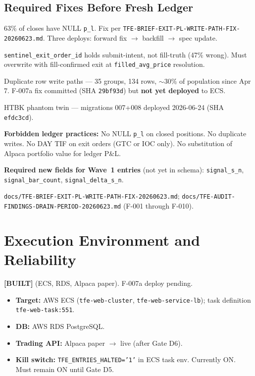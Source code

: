 \documentclass[11pt,a4paper]{article}
\newcommand{\statusbuilt}{\textcolor{statusbuilt}{\textbf{[BUILT]}}}
\newcommand{\code}[1]{\texttt{\small#1}}
\newcommand{\sha}[1]{\texttt{\footnotesize#1}}
\begin{document}
\subsection{Required Fixes Before Fresh Ledger}

\begin{description}[leftmargin=2.5cm, style=nextline]
  \item[\textbf{F-001 (BLOCKS)}] 63\% of closes have NULL \code{p\_l}. Fix per \texttt{TFE-BRIEF-EXIT-PL-WRITE-PATH-FIX-20260623.md}. Three deploys: forward fix $\to$ backfill $\to$ spec update.
  \item[\textbf{F-002 (BLOCKS)}] \code{sentinel\_exit\_order\_id} holds submit-intent, not fill-truth (47\% wrong). Must overwrite with fill-confirmed exit at \code{filled\_avg\_price} resolution.
  \item[\textbf{F-003 (BLOCKS)}] Duplicate row write paths — 35 groups, 134 rows, $\sim$30\% of population since Apr 7. F-007a fix committed (SHA \sha{29bf93d}) but \textbf{not yet deployed} to ECS.
  \item[\textbf{F-005 (RESOLVED)}] HTBK phantom twin — migrations 007+008 deployed 2026-06-24 (SHA \sha{efdc3cd}).
\end{description}

\textbf{Forbidden ledger practices:} No NULL \code{p\_l} on closed positions. No duplicate writes. No DAY TIF on exit orders (GTC or IOC only). No substitution of Alpaca portfolio value for ledger P\&L.

\textbf{Required new fields for Wave~1 entries} (not yet in schema): \code{signal\_s\_n}, \code{signal\_bar\_count}, \code{signal\_delta\_s\_n}.

\begin{sourcebox}
\texttt{docs/TFE-BRIEF-EXIT-PL-WRITE-PATH-FIX-20260623.md}; \texttt{docs/TFE-AUDIT-FINDINGS-DRAIN-PERIOD-20260623.md} (F-001 through F-010).
\end{sourcebox}

\section{Execution Environment and Reliability}

\statusbuilt{} (ECS, RDS, Alpaca paper). F-007a deploy pending.

\begin{itemize}
  \item \textbf{Target:} AWS ECS (\texttt{tfe-web-cluster}, \texttt{tfe-web-service-lb}); task definition \texttt{tfe-web-task:551}.
  \item \textbf{DB:} AWS RDS PostgreSQL.
  \item \textbf{Trading API:} Alpaca paper $\to$ live (after Gate D6).
  \item \textbf{Kill switch:} \code{TFE\_ENTRIES\_HALTED='1'} in ECS task env. Currently ON. Must remain ON until Gate D5.
\end{itemize}
\end{document}
